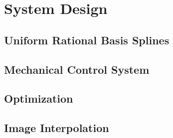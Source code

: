 \chapter{System Design}


\section{Uniform Rational Basis Splines}




\section{Mechanical Control System}

\section{Optimization}

%






\section{Image Interpolation}
